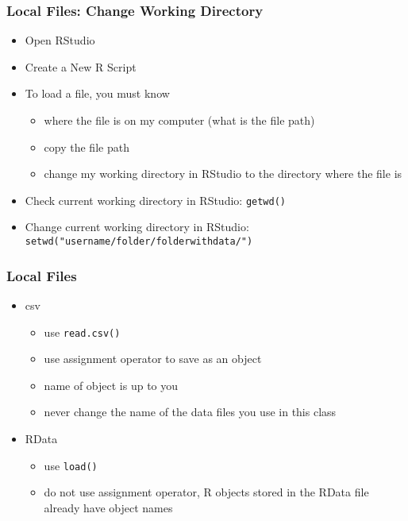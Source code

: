 \documentclass{beamer}
\begin{document}
\begin{frame}
 \frametitle<+->{Local Files: Change Working Directory}
 \begin{itemize}
   \item Open RStudio
   \item Create a New R Script
   \item To load a file, you must know
     \begin{itemize}
       \item where the file is on my computer (what is the file path)
       \item copy the file path
       \item change my working directory in RStudio to the directory where the file is
     \end{itemize}
   \item Check current working directory in RStudio: {\tt getwd()}
   \item Change current working directory in RStudio: {\footnotesize{\tt setwd("username/folder/folderwithdata/")}}
 \end{itemize}
\end{frame}

\begin{frame}
 \frametitle<+->{Local Files}
 \begin{itemize}
   \item csv
     \begin{itemize}
	   \item use {\tt read.csv()}
	   \item use assignment operator to save as an object
	   \item name of object is up to you
	   \item \alert{never change the name of the data files you use in this class}
     \end{itemize}
   \item RData
     \begin{itemize}
	   \item use {\tt load()}
	   \item do not use assignment operator, R objects stored in the RData file already have object names
     \end{itemize}
 \end{itemize}
\end{frame}
\end{document}
